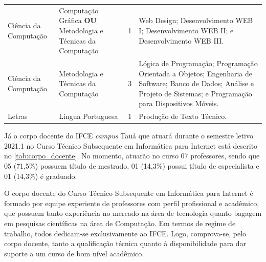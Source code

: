 \documentclass[
	12pt,				%
	openright,			%
	twoside,			%
	a4paper,			%
	chapter=TITLE,		%
	english,			%
	french,				%
	spanish,			%
	brazil,				%
	]{abntex2}
\begin{document}
\begin{quadro}[htpb]
{\begin{tabular}{ p{} p{} c p{}}
   \cellcolor{gray!05}Ciência da \newline Computação  &  \cellcolor{gray!05}Computação \newline Gráfica \newline \qquad\textbf{OU} \newline Metodologia e \newline Técnicas da \newline Computação &  \cellcolor{gray!05}1 &   \cellcolor{gray!05} Web Design; \newline  Desenvolvimento WEB I; \newline Desenvolvimento WEB II; e \newline Desenvolvimento WEB III. \\[1em]
        
        Ciência da \newline Computação       &  Metodologia e \newline Técnicas da \newline Computação &  3 & Lógica de Programação; \newline Programação Orientada a Objetos; \newline Engenharia de Software; \newline Banco de Dados; \newline Análise e Projeto de Sistemas; e \newline Programação para Dispositivos Móveis.\\
        
        \cellcolor{gray!05}Letras &   \cellcolor{gray!05}Língua Portuguesa     &    \cellcolor{gray!05}1 &   \cellcolor{gray!05}Produção de Texto Técnico.  \\
       

        \bottomrule
    \end{tabular}
   }{
            \vspace{-1em}
   }
\end{quadro}
Já o corpo docente do IFCE \textit{campus} Tauá que atuará durante o semestre letivo 2021.1 no Curso  Técnico Subsequente em Informática para Internet está descrito no \autoref{tab:corpo_docente}. No momento, atuarão no curso 07 professores, sendo que 05 (71,5\%) possuem título de mestrado,  01 (14,3\%) possui título de especialista e 01 (14,3\%) é graduado. 

O corpo docente do Curso Técnico Subsequente em Informática para Internet é formado por equipe experiente de professores com perfil profissional e acadêmico, que possuem tanto experiência no mercado na área de tecnologia quanto bagagem em pesquisas científicas na área de Computação. Em termos de regime de trabalho, todos dedicam-se exclusivamente ao IFCE. Logo, comprova-se, pelo corpo docente, tanto a qualificação técnica quanto à disponibilidade para dar suporte a um curso de bom nível acadêmico.
\end{document}
